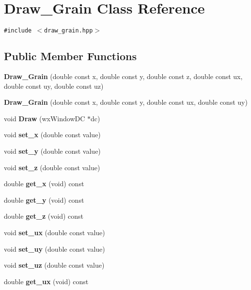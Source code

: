 \section{Draw\_\-Grain Class Reference}
\label{classDraw__Grain}
{\tt \#include $<$draw\_\-grain.hpp$>$}

\subsection*{Public Member Functions}
\begin{CompactItemize}
\item 
{\bf Draw\_\-Grain} (double const x, double const y, double const z, double const ux, double const uy, double const uz)\label{classDraw__Grain_a1}

\item 
{\bf Draw\_\-Grain} (double const x, double const y, double const ux, double const uy)\label{classDraw__Grain_a2}

\item 
void {\bf Draw} (wx\-Window\-DC $\ast$dc)\label{classDraw__Grain_a3}

\item 
void {\bf set\_\-x} (double const value)\label{classDraw__Grain_a4}

\item 
void {\bf set\_\-y} (double const value)\label{classDraw__Grain_a5}

\item 
void {\bf set\_\-z} (double const value)\label{classDraw__Grain_a6}

\item 
double {\bf get\_\-x} (void) const \label{classDraw__Grain_a7}

\item 
double {\bf get\_\-y} (void) const \label{classDraw__Grain_a8}

\item 
double {\bf get\_\-z} (void) const \label{classDraw__Grain_a9}

\item 
void {\bf set\_\-ux} (double const value)\label{classDraw__Grain_a10}

\item 
void {\bf set\_\-uy} (double const value)\label{classDraw__Grain_a11}

\item 
void {\bf set\_\-uz} (double const value)\label{classDraw__Grain_a12}

\item 
double {\bf get\_\-ux} (void) const \label{classDraw__Grain_a13}


\end{CompactItemize}
